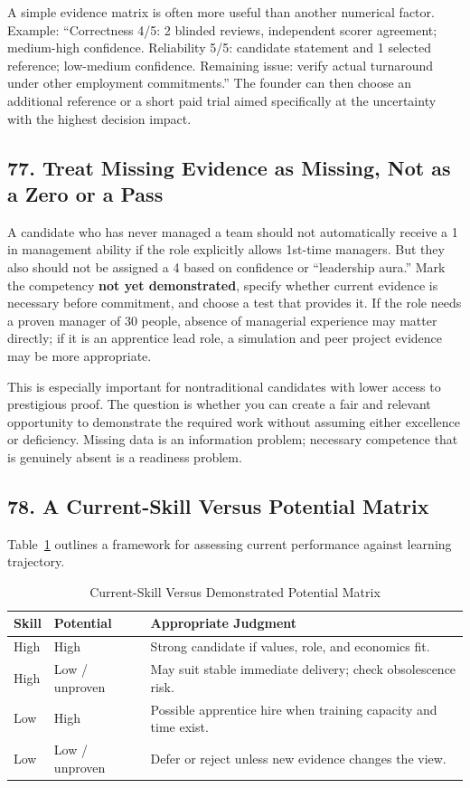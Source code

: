 A simple evidence matrix is often more useful than another numerical factor. Example: ``Correctness 4/5: 2 blinded reviews, independent scorer agreement; medium-high confidence. Reliability 5/5: candidate statement and 1 selected reference; low-medium confidence. Remaining issue: verify actual turnaround under other employment commitments.'' The founder can then choose an additional reference or a short paid trial aimed specifically at the uncertainty with the highest decision impact.

\subsection*{77. Treat Missing Evidence as Missing, Not as a Zero or a Pass}

A candidate who has never managed a team should not automatically receive a 1 in management ability if the role explicitly allows 1st-time managers. But they also should not be assigned a 4 based on confidence or ``leadership aura.'' Mark the competency \textbf{not yet demonstrated}, specify whether current evidence is necessary before commitment, and choose a test that provides it. If the role needs a proven manager of 30 people, absence of managerial experience may matter directly; if it is an apprentice lead role, a simulation and peer project evidence may be more appropriate.

This is especially important for nontraditional candidates with lower access to prestigious proof. The question is whether you can create a fair and relevant opportunity to demonstrate the required work without assuming either excellence or deficiency. Missing data is an information problem; necessary competence that is genuinely absent is a readiness problem.

\subsection*{78. A Current-Skill Versus Potential Matrix}

Table~\ref{tab:skill_potential_matrix} outlines a framework for assessing current performance against learning trajectory.

\begin{table}[htbp]
\centering
\small
\caption{Current-Skill Versus Demonstrated Potential Matrix}
\label{tab:skill_potential_matrix}
\begin{tabularx}{\columnwidth}{p{1.8cm} p{2.2cm} X}
\toprule
\textbf{Skill} & \textbf{Potential} & \textbf{Appropriate Judgment} \\
\midrule
High & High & Strong candidate if values, role, and economics fit. \\
High & Low / unproven & May suit stable immediate delivery; check obsolescence risk. \\
Low & High & Possible apprentice hire when training capacity and time exist. \\
Low & Low / unproven & Defer or reject unless new evidence changes the view. \\
\bottomrule
\end{tabularx}
\end{table}

